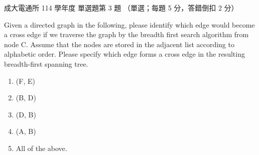 \begin{pastexam}[label={px:ncku-114-cce-ds-03}]{成大電通所 114 學年度 單選題第 3 題}
（單選；每題 5 分，答錯倒扣 2 分）

Given a directed graph in the following, please identify which edge would become a cross edge if we traverse
the graph by the breadth first search algorithm from node C. Assume that the nodes are stored in the adjacent
list according to alphabetic order. Please specify which edge forms a cross edge in the resulting breadth-first
spanning tree.

\begin{center}
\end{center}
\begin{enumerate}[label=\alph*),nosep]
\item (F, E)
\item (B, D)
\item (D, B)
\item (A, B)
\item All of the above.
\end{enumerate}
\end{pastexam}

